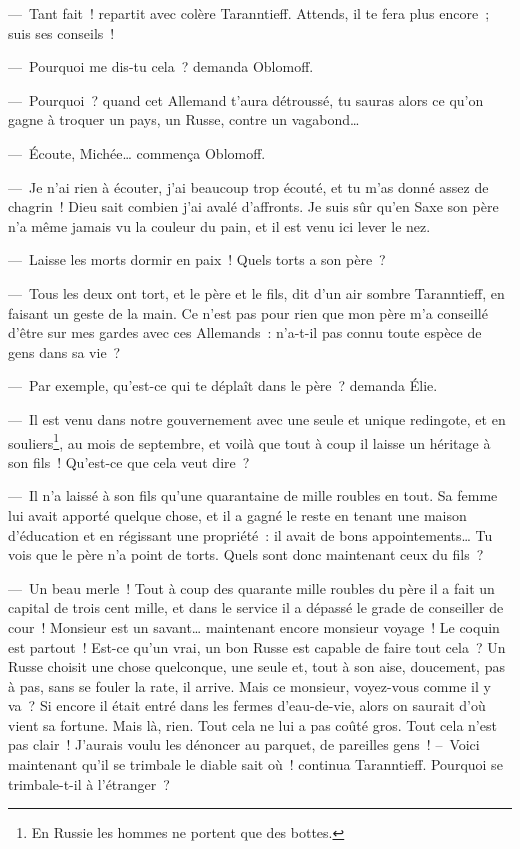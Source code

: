 \documentclass[french,twoside]{book} %
\begin{document}
— Tant fait ! repartit avec colère Taranntieff. Attends, il te fera plus encore ; suis ses conseils !\par
— Pourquoi me dis-tu cela ? demanda Oblomoff.\par
— Pourquoi ? quand cet Allemand t’aura détroussé, tu sauras alors ce qu’on gagne à troquer un pays, un Russe, contre un vagabond…\par
— Écoute, Michée… commença Oblomoff.\par
— Je n’ai rien à écouter, j’ai beaucoup trop écouté, et tu m’as donné assez de chagrin ! Dieu sait combien j’ai avalé d’affronts. Je suis sûr qu’en Saxe son père n’a même jamais vu la couleur du pain, et il est venu ici lever le nez.\par
— Laisse les morts dormir en paix ! Quels torts a son père ?\par
— Tous les deux ont tort, et le père et le fils, dit d’un air sombre Taranntieff, en faisant un geste de la main. Ce n’est pas pour rien que mon père m’a conseillé d’être sur mes gardes avec ces Allemands : n’a-t-il pas connu toute espèce de gens dans sa vie ?\par
— Par exemple, qu’est-ce qui te déplaît dans le père ? demanda Élie.\par
— Il est venu dans notre gouvernement avec une seule et unique redingote, et en souliers\footnote{En Russie les hommes ne portent que des bottes.}, au mois de septembre, et voilà que tout à coup il laisse un héritage à son fils ! Qu’est-ce que cela veut dire ?\par
— Il n’a laissé à son fils qu’une quarantaine de mille roubles en tout. Sa femme lui avait apporté quelque chose, et il a gagné le reste en tenant une maison d’éducation et en régissant une propriété : il avait de bons appointements… Tu vois que le père n’a point de torts. Quels sont donc maintenant ceux du fils ?\par
— Un beau merle ! Tout à coup des quarante mille roubles du père il a fait un capital de trois cent mille, et dans le service il a dépassé le grade de conseiller de cour ! Monsieur est un savant… maintenant encore monsieur voyage ! Le coquin est partout ! Est-ce qu’un vrai, un bon Russe est capable de faire tout cela ? Un Russe choisit une chose quelconque, une seule et, tout à son aise, doucement, pas à pas, sans se fouler la rate, il arrive. Mais ce monsieur, voyez-vous comme il y va ? Si encore il était entré dans les fermes d’eau-de-vie, alors on saurait d’où vient sa fortune. Mais là, rien. Tout cela ne lui a pas coûté gros. Tout cela n’est pas clair ! J’aurais voulu les dénoncer au parquet, de pareilles gens ! – Voici maintenant qu’il se trimbale le diable sait où ! continua Taranntieff. Pourquoi se trimbale-t-il à l’étranger ?\par
\end{document}
